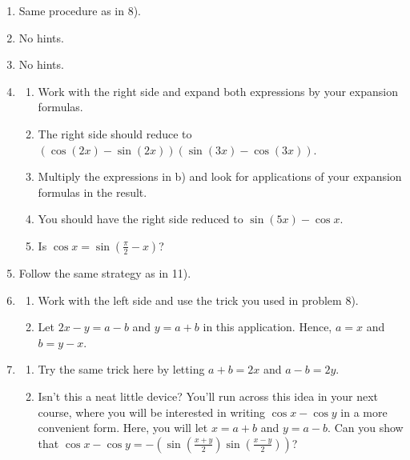 \documentclass[english]{book}
\begin{document}
\begin{enumerate}
\begin{enumerate}
\begin{enumerate}[\hspace{1cm}a)]
                \item Cool, huh?
              \end{enumerate}
        \item Same procedure as in 8).
        \item No hints.
        \item No hints.
        \item \begin{enumerate}[\hspace{1cm}a)]
                \item Work with the right side and expand both expressions by your expansion formulas.
                \item The right side should reduce to
                   \\ $(\cos(2x) - \sin(2x) )(\sin(3x) - \cos(3x) )$.
                \item Multiply the expressions in b) and look for applications of your expansion formulas in the result.
                \item You should have the right side reduced to $\sin(5x) - \cos x$.
                \item Is $\cos x = \sin(\frac{\pi}{2}-x)$?
              \end{enumerate}
        \item Follow the same strategy as in 11).
        \item \begin{enumerate}[\hspace{1cm}a)]
                \item Work with the left side and use the trick you used in problem 8).
                \item Let $2x-y=a-b$ and $y=a+b$ in this application. Hence, $a=x$ and $b=y-x$.
              \end{enumerate}
        \item \begin{enumerate}[\hspace{1cm}a)]
                \item Try the same trick here by letting $a+b=2x$ and $a-b=2y$.
                \item Isn't this a neat little device? You'll run across this idea in your next course, where you will be interested in writing $\cos x - \cos y$ in a more convenient form. Here, you will let $x=a+b$ and $y=a-b$. Can you show that $\cos x - \cos y = -( \sin(\frac{x+y}{2}) \sin(\frac{x-y}{2}) )$?
              \end{enumerate}

\end{enumerate}
\end{enumerate}
\end{document}
